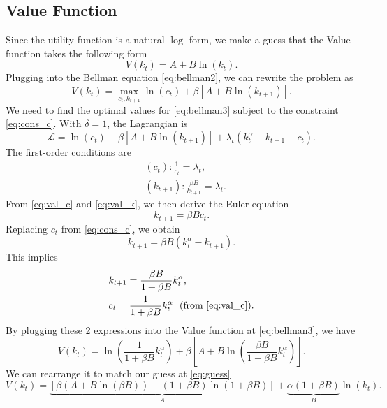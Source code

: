 \documentclass[10pt,a4paper]{article}
\begin{document}
\subsection{Value Function}
Since the utility function is a natural $\log$ form, we make a guess that the Value function takes the following form
\begin{equation}
	\label{eq:guess} V(k_t) = A + B \ln(k_t).
\end{equation}
Plugging into the Bellman equation \eqref{eq:bellman2}, we can rewrite the problem as
\begin{equation}
	\label{eq:bellman3} V(k_t) = \max_{c_t, k_{t+1}} \ln(c_t) + \beta [A + B\ln(k_{t+1})].
\end{equation}
We need to find the optimal values for \eqref{eq:bellman3} subject to the constraint \eqref{eq:cons_c}. With $\delta=1$, the Lagrangian is
\begin{equation}
	\mathcal{L} = \ln(c_t) + \beta [A + B\ln(k_{t+1})] + \lambda_t (k_t^\alpha - k_{t+1} - c_t).
\end{equation}
The first-order conditions are
\begin{align}
	& \label{eq:val_c} (c_t): \frac{1}{c_t} = \lambda_t, \\
	& \label{eq:val_k} (k_{t+1}): \frac{\beta B}{k_{t+1}} = \lambda_t.
\end{align}
From \eqref{eq:val_c} and \eqref{eq:val_k}, we then derive the Euler equation
\begin{equation}
	k_{t+1} = \beta B c_t.
\end{equation} 
Replacing $c_t$ from \eqref{eq:cons_c}, we obtain
\begin{equation}
	k_{t+1} = \beta B (k_t^\alpha - k_{t+1}).
\end{equation}
This implies
\begin{align}
	&\label{eq:sol_kt+1} k_{t+1} = \frac{\beta B}{1+\beta B} k_t^\alpha, \\
	&\label{eq:solc} c_t = \frac{1}{1+\beta B} k_t^\alpha \ \ \text{(from \eqref{eq:val_c})}.
\end{align}
By plugging these 2 expressions into the Value function at \eqref{eq:bellman3}, we have
\begin{equation*}
	V(k_t) = \ln \left( \frac{1}{1+\beta B} k_t^\alpha \right) + \beta \left[ A + B\ln\left(\frac{\beta B}{1+\beta B} k_t^\alpha \right) \right].
\end{equation*}
We can rearrange it to match our guess at \eqref{eq:guess}
\begin{equation}
	\label{eq:correct_value} V(k_t) = \underbrace{\left[ \beta(A + B\ln(\beta B)) - (1+\beta B)\ln(1+\beta B) \right]}_{A} + \underbrace{\alpha (1+\beta B)}_{B}\ln(k_t).
\end{equation}
\end{document}
